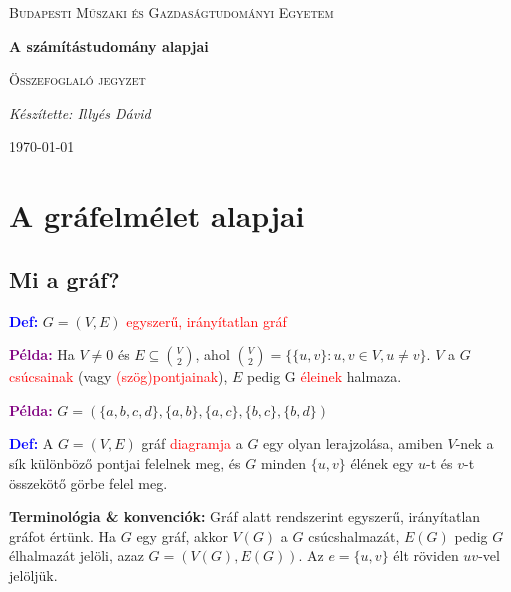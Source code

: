 \documentclass[12pt]{article}
\begin{document}
\begin{titlepage}
	\centering \vfill
	{\textsc{Budapesti Műszaki és Gazdaságtudományi Egyetem} \par} \vspace{7cm}
	{\huge\bfseries A számítástudomány alapjai\par} \vspace{0.5cm}
	{\large \textsc{Összefoglaló jegyzet}\par} \vspace{1.5cm}
	{\Large\itshape Készítette: Illyés Dávid\par} \vfill

	\noindent{}
	
	\vfill {\large \today\par}
\end{titlepage} 
\tableofcontents
{}

	\section{A gráfelmélet alapjai}
		\subsection{Mi a gráf?}
			
			\textcolor{blue}{\textbf{Def:}} $G = (V,E)$ \textcolor{red}{egyszerű, irányítatlan gráf}
			
			\textcolor{purple}{\textbf{Példa:}} Ha $ V \neq 0$ és $E \subseteq \binom{V}{2}$, ahol $\binom{V}{2} = \{\{u,v\} : u,v \in V, u \neq v\}$. $V$ a $G$ \textcolor{red}{csúcsainak} (vagy \textcolor{red}{(szög)pontjainak}), $E$ pedig G \textcolor{red}{éleinek} halmaza. 
			
			\textcolor{purple}{\textbf{Példa:}} $G = (\{a,b,c,d\},\{a,b\},\{a,c\},\{b,c\},\{b,d\})$
			
			\textcolor{blue}{\textbf{Def:}} A $G = (V,E)$ gráf \textcolor{red}{diagramja} a $G$ egy olyan lerajzolása, amiben $V$-nek a sík különböző pontjai felelnek meg, és $G$ minden $\{u,v\}$ élének egy $u$-t és $v$-t összekötő görbe felel meg.
			
			\textbf{Terminológia \& konvenciók:} Gráf alatt rendszerint egyszerű, irányítatlan gráfot értünk. Ha $G$ egy gráf, akkor $V(G)$ a $G$ csúcshalmazát, $E(G)$ pedig $G$ élhalmazát jelöli, azaz $G = (V(G),E(G))$. Az $e = \{u,v\}$ élt röviden $uv$-vel jelöljük. 
			
\end{document}
